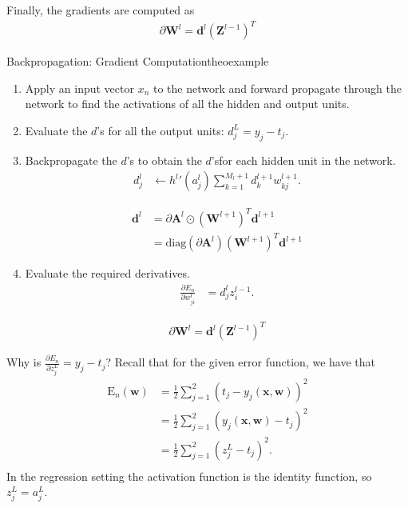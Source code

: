 \documentclass{tufte-handout}
\begin{document}
Finally, the gradients are computed as
\begin{align*}
\partial \mathbf W^l = \mathbf d^l ( \mathbf Z^{l-1})^T
\end{align*}

\begin{mybox}{Backpropagation: Gradient Computation}{theoexample}
\begin{enumerate}
\item  Apply an input vector $x_n$ to the network and forward propagate through the network to find the activations of all the hidden and output units.
\item Evaluate the $d$'s for all the output units: $d_{j}^L = y_{j} - t_{j}$. 
\item Backpropagate the $d$'s  to obtain the $d$'sfor each hidden unit in the
network.
\begin{align*}
d_j^l  &\leftarrow {h^l}'(a_j^l) \sum_{k=1}^{M_{l}+1} d_{k}^{l+1} w_{kj}^{l+1}.
\end{align*}

\begin{align*}
\mathbf d^l  & =  \partial \mathbf A^l \odot (\mathbf W^{l+1})^T  \mathbf d^{l+1}\\
&=\mathrm{diag}( \partial \mathbf A^l )(\mathbf W^{l+1})^T  \mathbf d^{l+1}
\end{align*}

\item  Evaluate the required derivatives.
\begin{align*}
\frac{\partial E_n}{\partial w_{ji}^l}
&=d_{j}^lz_i^{l-1}.
\end{align*}

\begin{align*}
\partial \mathbf W^l = \mathbf d^l ( \mathbf Z^{l-1})^T
\end{align*}
\end{enumerate}
\end{mybox}
Why is $\frac{\partial E_n}{\partial z^L_j}= y_{j} - t_{j}$? Recall that for the given error function, we have that
\begin{align*}
\mathrm E_n(\mathbf w) &=  \frac{1}{2} \sum_{j=1}^2 \left( t_{j} -  y_j(\mathbf x, \mathbf w) \right)^2 \\
&= \frac{1}{2}  \sum_{j=1}^2 \left(  y_j(\mathbf x, \mathbf w) - t_j\right)^2 \\
&=  \frac{1}{2}  \sum_{j=1}^2 \left(   z^L_j  - t_{j} \right)^2. \\
\end{align*}
In the regression setting the activation function is the identity function, so $z_j^L = a_j^L$.
\end{document}
